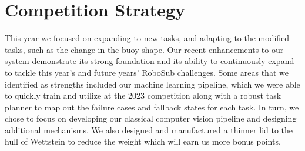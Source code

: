 \documentclass[conference]{IEEEtran}
\begin{document}
\section{Competition Strategy} \label{sec:comp_strat}
This year we focused on expanding to new tasks, and adapting to the modified tasks, such as the change in the buoy shape. Our recent enhancements to our system demonstrate its strong foundation and its ability to continuously expand to tackle this year’s and future years’ RoboSub challenges. Some areas that we identified as strengths included our machine learning pipeline, which we were able to quickly train and utilize at the 2023 competition along with a robust task planner to map out the failure cases and fallback states for each task. In turn, we chose to focus on developing our classical computer vision pipeline and designing additional mechanisms. We also designed and manufactured a thinner lid to the hull of Wettstein to reduce the weight which will earn us more bonus points.

\end{document}
